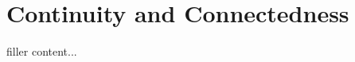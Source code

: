 \documentclass[../../templates/section]{subfiles}
\begin{document}
\section{Continuity and Connectedness}\label{sec:continuity-and-connectedness}

filler content...
\end{document}
